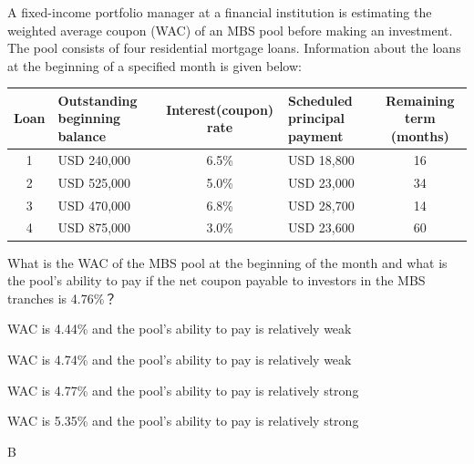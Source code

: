 \documentclass{article}
\newcounter{question} %
\begin{document}
\begin{question}
    A fixed-income portfolio manager at a financial institution is estimating the weighted average coupon (WAC) of an MBS pool before making an investment. The pool consists of four residential mortgage loans. Information about the loans at the beginning of a specified month is given below:

    \begin{table}[H]
        \centering
        \begin{tabular}{|c|l|c|l|c|}
        \hline
        Loan & Outstanding beginning balance & Interest(coupon) rate & Scheduled principal payment & Remaining term (months) \\
        \hline
        1 & USD 240,000 & 6.5\% & USD 18,800 & 16 \\
        \hline
        2 & USD 525,000 & 5.0\% & USD 23,000 & 34 \\
        \hline
        3 & USD 470,000 & 6.8\% & USD 28,700 & 14 \\
        \hline
        4 & USD 875,000 & 3.0\% & USD 23,600 & 60 \\
        \hline
        \end{tabular}
    \end{table}

    What is the WAC of the MBS pool at the beginning of the month and what is the pool's ability to pay if the net coupon payable to investors in the MBS tranches is 4.76\%？
\end{question}

\begin{choices}
    \item WAC is 4.44\% and the pool's ability to pay is relatively weak
    \item WAC is 4.74\% and the pool's ability to pay is relatively weak
    \item WAC is 4.77\% and the pool's ability to pay is relatively strong
    \item WAC is 5.35\% and the pool's ability to pay is relatively strong
\end{choices}

\begin{correctanswer}
    B
\end{correctanswer}
\end{document}
